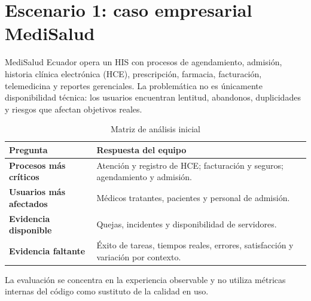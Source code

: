 \chapter{Escenario 1: caso empresarial MediSalud}

MediSalud Ecuador opera un HIS con procesos de agendamiento, admisión, historia clínica electrónica (HCE), prescripción, farmacia, facturación, telemedicina y reportes gerenciales. La problemática no es únicamente disponibilidad técnica: los usuarios encuentran lentitud, abandonos, duplicidades y riesgos que afectan objetivos reales.

\begin{table}[H]\centering
\caption{Matriz de análisis inicial}
\begin{tabularx}{\textwidth}{>{\bfseries}p{}X}
\toprule
Pregunta & Respuesta del equipo\\\midrule
Procesos más críticos & Atención y registro de HCE; facturación y seguros; agendamiento y admisión.\\
Usuarios más afectados & Médicos tratantes, pacientes y personal de admisión.\\
Evidencia disponible & Quejas, incidentes y disponibilidad de servidores.\\
Evidencia faltante & Éxito de tareas, tiempos reales, errores, satisfacción y variación por contexto.\\\bottomrule
\end{tabularx}
\end{table}

La evaluación se concentra en la experiencia observable y no utiliza métricas internas del código como sustituto de la calidad en uso.

